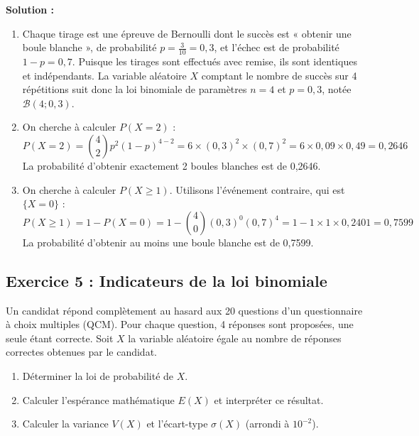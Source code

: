 \textbf{Solution :}
\begin{enumerate}
    \item Chaque tirage est une épreuve de Bernoulli dont le succès est « obtenir une boule blanche », de probabilité $p = \frac{3}{10} = 0,3$, et l'échec est de probabilité $1-p = 0,7$.
    Puisque les tirages sont effectués avec remise, ils sont identiques et indépendants. La variable aléatoire $X$ comptant le nombre de succès sur 4 répétitions suit donc la loi binomiale de paramètres $n = 4$ et $p = 0,3$, notée $\mathcal{B}(4; 0,3)$.
    
    \item On cherche à calculer $P(X = 2)$ :
    \[
    P(X = 2) = \binom{4}{2} p^2 (1-p)^{4-2} = 6 \times (0,3)^2 \times (0,7)^2 = 6 \times 0,09 \times 0,49 = 0,2646
    \]
    La probabilité d'obtenir exactement 2 boules blanches est de 0,2646.
    
    \item On cherche à calculer $P(X \ge 1)$. Utilisons l'événement contraire, qui est $\{X = 0\}$ :
    \[
    P(X \ge 1) = 1 - P(X = 0) = 1 - \binom{4}{0} (0,3)^0 (0,7)^4 = 1 - 1 \times 1 \times 0,2401 = 0,7599
    \]
    La probabilité d'obtenir au moins une boule blanche est de 0,7599.
\end{enumerate}

\subsection*{Exercice 5 : Indicateurs de la loi binomiale}
Un candidat répond complètement au hasard aux 20 questions d'un questionnaire à choix multiples (QCM). Pour chaque question, 4 réponses sont proposées, une seule étant correcte.
Soit $X$ la variable aléatoire égale au nombre de réponses correctes obtenues par le candidat.
\begin{enumerate}
    \item Déterminer la loi de probabilité de $X$.
    \item Calculer l'espérance mathématique $E(X)$ et interpréter ce résultat.
    \item Calculer la variance $V(X)$ et l'écart-type $\sigma(X)$ (arrondi à $10^{-2}$).
\end{enumerate}

